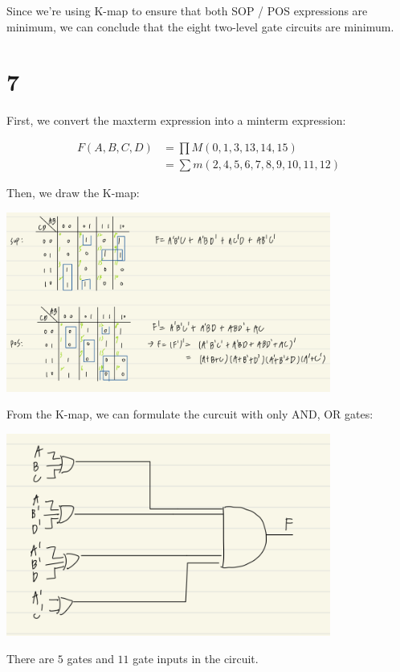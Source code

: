 \documentclass{article}
\begin{document}
Since we're using K-map to ensure that both SOP / POS expressions are minimum,
we can conclude that the eight two-level gate circuits are minimum.

\newpage

\section*{7}

First, we convert the maxterm expression into a minterm expression:

\begin{align*}
    F(A, B, C, D) 
    &= \prod M(0, 1, 3, 13, 14, 15)  \\
    &= \sum m(2, 4, 5, 6, 7, 8, 9, 10, 11, 12) 
\end{align*}

Then, we draw the K-map:

\begin{center}
    \includegraphics[width=0.8\textwidth]{HW2_7_KMap}
\end{center}

From the K-map, we can formulate the curcuit with only AND, OR gates:

\begin{center}
    \includegraphics[width=0.8\textwidth]{HW2_7_gate}
\end{center}

There are $5$ gates and $11$ gate inputs in the circuit.
\end{document}
